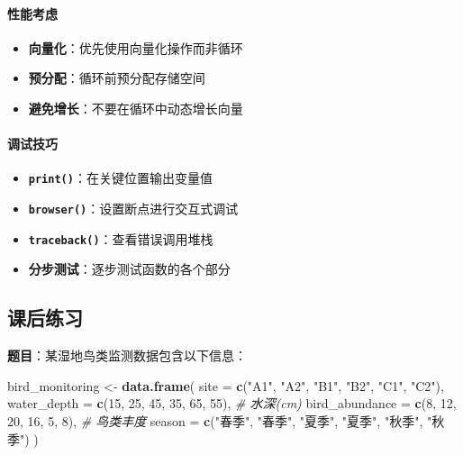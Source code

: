 \documentclass[
  twoside]{book}
\newenvironment{Shaded}{\begin{snugshade}}{\end{snugshade}}
\newcommand{\AttributeTok}[1]{\textcolor[rgb]{0.13,0.29,0.53}{#1}}
\newcommand{\CommentTok}[1]{\textcolor[rgb]{0.56,0.35,0.01}{\textit{#1}}}
\newcommand{\DecValTok}[1]{\textcolor[rgb]{0.00,0.00,0.81}{#1}}
\newcommand{\FunctionTok}[1]{\textcolor[rgb]{0.13,0.29,0.53}{\textbf{#1}}}
\newcommand{\NormalTok}[1]{#1}
\newcommand{\OtherTok}[1]{\textcolor[rgb]{0.56,0.35,0.01}{#1}}
\newcommand{\StringTok}[1]{\textcolor[rgb]{0.31,0.60,0.02}{#1}}
\providecommand{\tightlist}{%
  \setlength{\itemsep}{0pt}\setlength{\parskip}{0pt}}
\begin{document}
\hypertarget{ux6027ux80fdux8003ux8651}{%
\paragraph{性能考虑}\label{ux6027ux80fdux8003ux8651}}

\begin{itemize}
\tightlist
\item
  \textbf{向量化}：优先使用向量化操作而非循环
\item
  \textbf{预分配}：循环前预分配存储空间
\item
  \textbf{避免增长}：不要在循环中动态增长向量
\end{itemize}

\hypertarget{ux8c03ux8bd5ux6280ux5de7}{%
\paragraph{调试技巧}\label{ux8c03ux8bd5ux6280ux5de7}}

\begin{itemize}
\tightlist
\item
  \textbf{\texttt{print()}}：在关键位置输出变量值
\item
  \textbf{\texttt{browser()}}：设置断点进行交互式调试
\item
  \textbf{\texttt{traceback()}}：查看错误调用堆栈
\item
  \textbf{分步测试}：逐步测试函数的各个部分
\end{itemize}

\hypertarget{ux8bfeux540eux7ec3ux4e60-7}{%
\subsection{课后练习}\label{ux8bfeux540eux7ec3ux4e60-7}}

\textbf{题目}：某湿地鸟类监测数据包含以下信息：

\begin{Shaded}
\begin{Highlighting}[]
\NormalTok{bird\_monitoring }\OtherTok{\textless{}{-}} \FunctionTok{data.frame}\NormalTok{(}
  \AttributeTok{site =} \FunctionTok{c}\NormalTok{(}\StringTok{"A1"}\NormalTok{, }\StringTok{"A2"}\NormalTok{, }\StringTok{"B1"}\NormalTok{, }\StringTok{"B2"}\NormalTok{, }\StringTok{"C1"}\NormalTok{, }\StringTok{"C2"}\NormalTok{),}
  \AttributeTok{water\_depth =} \FunctionTok{c}\NormalTok{(}\DecValTok{15}\NormalTok{, }\DecValTok{25}\NormalTok{, }\DecValTok{45}\NormalTok{, }\DecValTok{35}\NormalTok{, }\DecValTok{65}\NormalTok{, }\DecValTok{55}\NormalTok{),  }\CommentTok{\# 水深(cm)}
  \AttributeTok{bird\_abundance =} \FunctionTok{c}\NormalTok{(}\DecValTok{8}\NormalTok{, }\DecValTok{12}\NormalTok{, }\DecValTok{20}\NormalTok{, }\DecValTok{16}\NormalTok{, }\DecValTok{5}\NormalTok{, }\DecValTok{8}\NormalTok{),   }\CommentTok{\# 鸟类丰度}
  \AttributeTok{season =} \FunctionTok{c}\NormalTok{(}\StringTok{"春季"}\NormalTok{, }\StringTok{"春季"}\NormalTok{, }\StringTok{"夏季"}\NormalTok{, }\StringTok{"夏季"}\NormalTok{, }\StringTok{"秋季"}\NormalTok{, }\StringTok{"秋季"}\NormalTok{)}
\NormalTok{)}
\end{Highlighting}
\end{Shaded}
\end{document}
